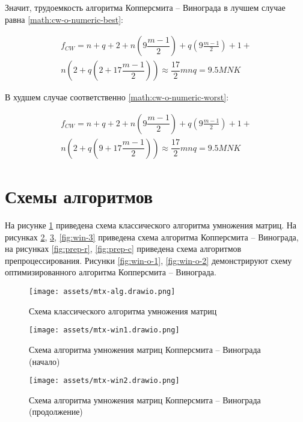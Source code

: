 Значит, трудоемкость алгоритма Копперсмита -- Винограда в лучшем случае равна \ref{math:cw-o-numeric-best}:

\begin{multline}\label{math:cw-o-numeric-best}
	f_{CW} = n + q + 2 + n\left(9 \dfrac{m - 1}{2}\right) + q\left(9 \frac{m - 1}{2}\right) + 1 + \\
	n \left(2 + q\left(2 + 17\dfrac{m - 1}{2}\right)\right)  \approx \dfrac{17}{2}mnq = 9.5MNK 
\end{multline}

В худшем случае соответственно \ref{math:cw-o-numeric-worst}:

\begin{multline}\label{math:cw-o-numeric-worst}
	f_{CW} = n + q + 2 + n\left(9 \dfrac{m - 1}{2}\right) + q\left(9 \frac{m - 1}{2}\right) + 1 + \\
	n \left(2 + q\left(9 + 17\dfrac{m - 1}{2}\right)\right) \approx \dfrac{17}{2}mnq = 9.5MNK 
\end{multline}

\section{Схемы алгоритмов}
На рисунке \ref{fig:alg} приведена схема классического алгоритма умножения матриц. На рисунках \ref{fig:win-1}, \ref{fig:win-2}, \ref{fig:win-3} приведена схема алгоритма Копперсмита -- Винограда, на рисунках  \ref{fig:prep-r}, \ref{fig:prep-c} приведена схема алгоритмов препроцессирования. Рисунки  
\ref{fig:win-o-1}, \ref{fig:win-o-2} демонстрируют схему оптимизированного алгоритма Копперсмита -- Винограда.\newpage

\begin{figure}[H]
	\centering
	\texttt{[image: assets/mtx-alg.drawio.png]}
	\caption{Схема классического алгоритма умножения матриц}
	\label{fig:alg}
\end{figure}

\begin{figure}[H]
	\centering
	\texttt{[image: assets/mtx-win1.drawio.png]}
	\caption{Схема алгоритма умножения матриц Копперсмита -- Винограда (начало)}
	\label{fig:win-1}
\end{figure}

\begin{figure}[H]
	\centering
	\texttt{[image: assets/mtx-win2.drawio.png]}
	\caption{Схема алгоритма умножения матриц Копперсмита -- Винограда (продолжение)}
	\label{fig:win-2}
\end{figure}


